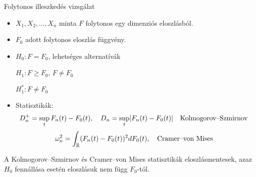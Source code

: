 \documentclass[aspectratio=169,notheorems,9pt,\option]{beamer}
\begin{document}
\maketitle
\begin{frame}{Folytonos illeszkedés vizsgálat}
  \begin{itemize}
    \item $X_1,X_2,\dots,X_n$ minta  $F$ folytonos egy dimenziós
    eloszlásból.
    \item $F_0$ adott folytonos eloszlás függvény.
    \item $H_0: F=F_0$, lehetséges alternatívák
    
    $H_1:F\geq F_0$, $F \neq F_0$ %
    
    $H^*_1:F\neq F_0$ %
    \item Statisztikák:
    \begin{displaymath}
      D_n^+=\sup_t F_n (t)-F_0 (t),
      \quad 
      D_n=\sup_t\abs*{F_n (t)-F_0 (t)}
      \quad\text{Kolmogorov--Szmirnov}
    \end{displaymath}
    \begin{displaymath}
      \omega^2_n=\int_{\mathbb{R}} (F_n (t)-F_0 (t))^2 dF_0 (t),
      \quad\text{Cramer--von Mises}
    \end{displaymath}
  \end{itemize}
  \begin{proposition}
    A Kolmogorov--Szmirnov és Cramer--von Mises statisztikák
    eloszlásmentesek, azaz $H_0$ fennállása esetén eloszlásuk nem függ $F_0$-tól.
  \end{proposition}
\end{frame}
\end{document}
